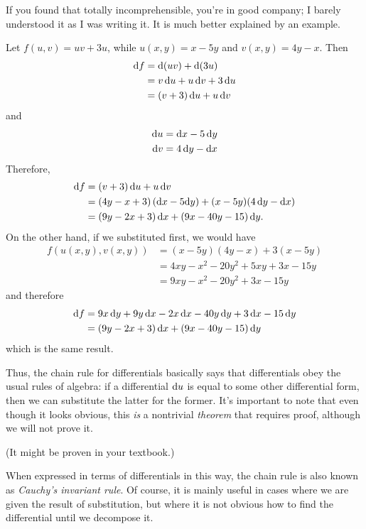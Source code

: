 If you found that totally incomprehensible, you're in good company; I barely understood it as I was writing it.
It is much better explained by an example.

\begin{eg}
  Let $f(u,v) = u v + 3u$, while $u(x,y) = x-5y$ and $v(x,y) = 4y-x$.
  Then
  \begin{align*}
    {\ensuremath{\mathrm{d} f}} &= \mathrm{d}(u v) + \mathrm{d}(3u)\\
    &= v \,{\mathrm{d} u} + u\,{\mathrm{d} v} + 3 \,{\mathrm{d} u}\\
    &= (v+3)\,{\mathrm{d} u} + u\,{\mathrm{d} v}
  \end{align*}
  and
  \begin{align*}
    {\ensuremath{\mathrm{d} u}} &= {\mathrm{d} x} - 5\, {\mathrm{d} y}\\
    {\mathrm{d} v} &= 4\,{\mathrm{d} y} - {\mathrm{d} x}
  \end{align*}
  Therefore,
  \begin{align*}
    {\ensuremath{\mathrm{d} f}} &= (v+3)\,{\mathrm{d} u} + u\,{\mathrm{d} v}\\
    &= (4y-x+3)\,({\mathrm{d} x} - 5 {\mathrm{d} y}) + (x-5y) (4\,{\mathrm{d} y} - {\mathrm{d} x}) \\
    &= (9y-2x+3)\,{\mathrm{d} x} + (9x - 40y - 15)\,{\mathrm{d} y}.
  \end{align*}
  On the other hand, if we substituted first, we would have
  \begin{align*}
    f(u(x,y),v(x,y)) &= (x-5y)(4y-x) + 3(x-5y)\\
    &= 4xy - x^2 - 20y^2 + 5xy + 3x - 15 y\\
    &= 9xy - x^2 - 20y^2 + 3x - 15 y
  \end{align*}
  and therefore
  \begin{align*}
    {\ensuremath{\mathrm{d} f}} &= 9x\, {\mathrm{d} y} + 9y\, {\mathrm{d} x} - 2 x\,{\mathrm{d} x} - 40 y\,{\mathrm{d} y} + 3\,{\mathrm{d} x} - 15\,{\mathrm{d} y}\\
    &= (9y - 2x +3)\,{\mathrm{d} x} + (9x - 40y - 15)\,{\mathrm{d} y}
  \end{align*}
  which is the same result.
\end{eg}

Thus, the chain rule for differentials basically says that differentials obey the usual rules of algebra: if a differential ${\mathrm{d} u}$ is equal to some other differential form, then we can substitute the latter for the former.
It's important to note that even though it looks obvious, this \emph{is} a nontrivial \emph{theorem} that requires proof, although we will not prove it.
\begin{notextbook}(It might be proven in your textbook.)\end{notextbook}

When expressed in terms of differentials in this way, the chain rule is also known as \emph{Cauchy's invariant rule}.
Of course, it is mainly useful in cases where we are given the result of substitution, but where it is not obvious how to find the differential until we decompose it.

